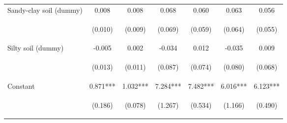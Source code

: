 \begin{center}
\begin{tabular}{lcccccc}
Sandy-clay soil (dummy) & 0.008 & 0.008 & 0.068 & 0.060 & 0.063 & 0.056 \\
\vspace{4pt} & \begin{footnotesize}(0.010)\end{footnotesize} & \begin{footnotesize}(0.009)\end{footnotesize} & \begin{footnotesize}(0.069)\end{footnotesize} & \begin{footnotesize}(0.059)\end{footnotesize} & \begin{footnotesize}(0.064)\end{footnotesize} & \begin{footnotesize}(0.055)\end{footnotesize} \\
Silty soil (dummy) & -0.005 & 0.002 & -0.034 & 0.012 & -0.035 & 0.009 \\
\vspace{4pt} & \begin{footnotesize}(0.013)\end{footnotesize} & \begin{footnotesize}(0.011)\end{footnotesize} & \begin{footnotesize}(0.087)\end{footnotesize} & \begin{footnotesize}(0.074)\end{footnotesize} & \begin{footnotesize}(0.080)\end{footnotesize} & \begin{footnotesize}(0.068)\end{footnotesize} \\
Constant & 0.871*** & 1.032*** & 7.284*** & 7.482*** & 6.016*** & 6.123*** \\
 & \begin{footnotesize}(0.186)\end{footnotesize} & \begin{footnotesize}(0.078)\end{footnotesize} & \begin{footnotesize}(1.267)\end{footnotesize} & \begin{footnotesize}(0.534)\end{footnotesize} & \begin{footnotesize}(1.166)\end{footnotesize} & \begin{footnotesize}(0.490)\end{footnotesize} \\

\end{tabular}
\end{center}
